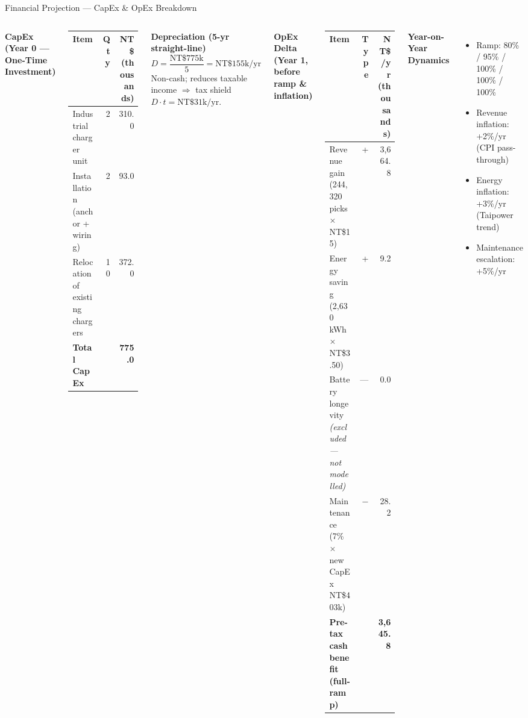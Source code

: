 \documentclass[aspectratio=169,10pt]{beamer}
\begin{document}
\begin{frame}{Financial Projection --- CapEx \& OpEx Breakdown}
  \footnotesize
  \begin{columns}[T]
    \textbf{\color{boxblue} CapEx (Year 0 --- One-Time Investment)} \\
    \vspace{0.3em}
    \begin{tabular}{p{}rr}
      \toprule
      Item & Qty & NT\$ (thousands) \\
      \midrule
      Industrial charger unit & 2 & 310.0 \\
      Installation (anchor + wiring) & 2 & 93.0 \\
      Relocation of existing chargers & 10 & 372.0 \\
      \midrule
      \textbf{Total CapEx} & & \textbf{775.0} \\
      \bottomrule
    \end{tabular}

    \vspace{0.6em}
    \textbf{\color{boxblue} Depreciation (5-yr straight-line)}
    \[
      D = \frac{\text{NT\$}775\text{k}}{5} = \text{NT\$}155\text{k/yr}
    \]
    Non-cash; reduces taxable income $\Rightarrow$ tax shield $D \cdot t = \text{NT\$}31\text{k/yr}$.

    \textbf{\color{boxgreen} OpEx Delta (Year 1, before ramp \& inflation)} \\
    \vspace{0.3em}
    \begin{tabular}{p{}rr}
      \toprule
      Item & Type & NT\$/yr (thousands) \\
      \midrule
      Revenue gain (244{,}320 picks $\times$ NT\$15) & + & 3{,}664.8 \\
      Energy saving (2{,}630 kWh $\times$ NT\$3.50) & + & 9.2 \\
      Battery longevity \emph{(excluded --- not modelled)} & --- & 0.0 \\
      Maintenance (7\% $\times$ new CapEx NT\$403k) & $-$ & 28.2 \\
      \midrule
      \textbf{Pre-tax cash benefit (full-ramp)} & & \textbf{3{,}645.8} \\
      \bottomrule
    \end{tabular}

    \vspace{0.6em}
    \textbf{\color{boxgreen} Year-on-Year Dynamics}
    \begin{itemize}
      \item Ramp: 80\% / 95\% / 100\% / 100\% / 100\%
      \item Revenue inflation: +2\%/yr (CPI pass-through)
      \item Energy inflation: +3\%/yr (Taipower trend)
      \item Maintenance escalation: +5\%/yr
    \end{itemize}
  \end{columns}
\end{frame}
\end{document}
